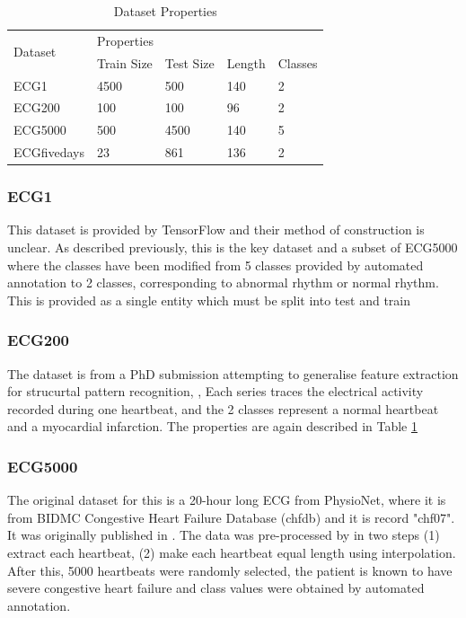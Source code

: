 \documentclass[journal]{IEEEtran}
\begin{document}
\begin{table}[]
    \renewcommand{\arraystretch}{1.3}
    \centering
    \caption{Dataset Properties}
    \label{tab:datasets}
    
    \begin{tabular}{lllll}
    \hline
    \multirow{2}{*}{Dataset} & \multicolumn{4}{l}{Properties}            \\ \cline{2-5} 
                             & Train Size & Test Size & Length & Classes \\ \hline
    ECG1                     & 4500       & 500       & 140    & 2       \\
    ECG200                   & 100        & 100       & 96     & 2       \\
    ECG5000                  & 500        & 4500      & 140    & 5       \\
    ECGfivedays              & 23         & 861       & 136    & 2       \\ \hline
    \end{tabular}

\end{table}

\subsubsection{ECG1}
This dataset is provided by TensorFlow and their method of construction is unclear. As described previously, this is the key dataset and a subset of ECG5000 where the classes have been modified from 5 classes provided by automated annotation to 2 classes, corresponding to abnormal rhythm or normal rhythm. This is provided as a single entity which must be split into test and train

\subsubsection{ECG200}
The dataset is from a PhD submission attempting to generalise feature extraction for strucurtal pattern recognition, \cite{olszewski2001}, Each series traces the electrical activity recorded during one heartbeat, and the 2 classes represent a normal heartbeat and a myocardial infarction. The properties are again described in Table \ref{tab:datasets}

\subsubsection{ECG5000}
The original dataset for this is a 20-hour long ECG from PhysioNet, where it is from BIDMC Congestive Heart Failure Database (chfdb) and it is record "chf07". It was originally published in \cite{Goldberger2000}. The data was pre-processed by \cite{Chen2014} in two steps (1) extract each heartbeat, (2) make each heartbeat equal length using interpolation. After this, 5000 heartbeats were randomly selected, the patient is known to have severe congestive heart failure and class values were obtained by automated annotation.
\end{document}
